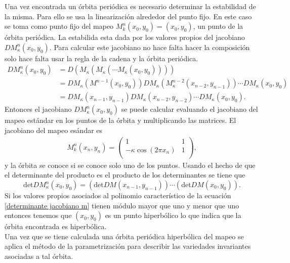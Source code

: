 Una vez encontrada un \'orbita peri\'odica es necesario determinar la estabilidad de la misma. Para ello se usa la linearizaci\'on alrededor del punto fijo. En este caso se toma como punto fijo  del mapeo  $M^{n}_{k}(x_{0},y_{0})=(x_{0},y_{0})$, un punto de la \'orbita peri\'odica. La estabilida esta dada por los valores propios del jacobiano $DM^{n}_{\kappa}(x_{0},y_{0})$. Para calcular este jacobiano no hace falta hacer la composici\'on solo hace falta usar la regla de la cadena y la \'orbita peri\'odica.
\begin{align*}
DM^{n}_{\kappa}(x_{0},y_{0}) &= D(M_{\kappa}(M_{\kappa}(\cdots M_{\kappa}(x_{0},y_{0}))))\\
& = DM_{\kappa}(M^{n-1}(x_{0},y_{0}))DM_{\kappa}(M^{n-2}_{\kappa}(x_{n-2},y_{n-1}))\cdots DM_{\kappa}(x_{0},y_{0})\\
& = DM_{\kappa}(x_{n-1},y_{n-1})DM_{\kappa}(x_{n-2},y_{n-2})\cdots DM_{\kappa}(x_{0},y_{0}).
\end{align*}
Entonces el jacobiano $DM^{n}_{\kappa}(x_{0},y_{0})$ se puede calcular evaluando el jacobiano del mapeo est\'andar en los puntos de la \'orbita y multiplicando las matrices. El jacobiano del mapeo es\'andar es
\begin{eqnarray}
M^{n}_{k}(x_{n},y_{n})=\begin{pmatrix}
1 & 1 \\
- \kappa\cos(2\pi x_{n})& 1\\ 
\end{pmatrix},
\label{jacobiano mapeo}
\end{eqnarray}
y la \'orbita se conoce si se conoce solo uno de los puntos. Usando el hecho de que el determinante del producto es el producto de los determinantes se tiene que 
\begin{equation}
\textrm{det}DM^{n}_{\kappa}(x_{0},y_{0}) = \left(\textrm{det} DM(x_{n-1},y_{n-1})\right) \cdots \left(\textrm{det} DM(x_{0},y_{0})\right).
\label{determinante jacobiano m}
\end{equation} 
Si los valores propios asociados al polinomio caracter\'istico de la ecuaci\'on \eqref{determinante jacobiano m} tienen m\'odulo mayor que uno y menor que uno entonces tenemos que $(x_{0},y_{0})$ es un punto hiperb\'olico lo que indica que la \'orbita encontrada es hiperb\'olica. \\

Una vez que se tiene calculada una \'orbita peri\'odica hiperb\'olica del mapeo se aplica el m\'etodo de la parametrizaci\'on para describir las variedades invariantes asociadas a tal \'orbita. 


